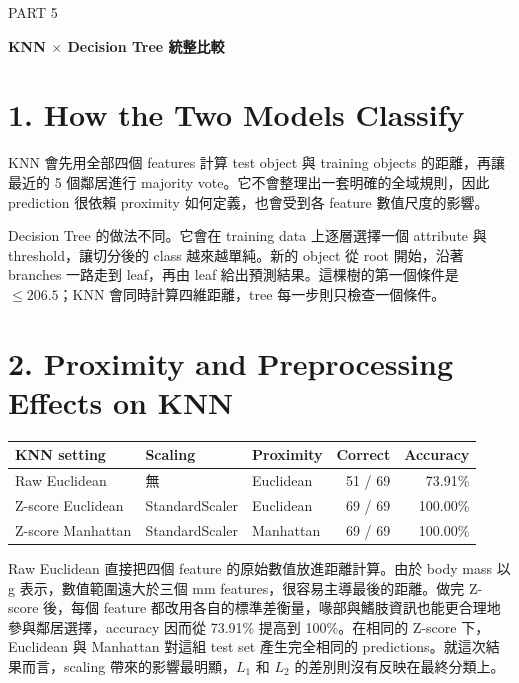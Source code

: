 \clearpage

\begin{center}
  {\color{accent}\large PART 5}\par
  \vspace{0.25em}
  {\Large\bfseries KNN $\times$ Decision Tree 統整比較}\par
\end{center}

\vspace{1.0em}

\section*{1. How the Two Models Classify}
\sectionrule

KNN 會先用全部四個 features 計算 test object 與 training objects 的距離，再讓最近的 5 個鄰居進行 majority vote。它不會整理出一套明確的全域規則，因此 prediction 很依賴 proximity 如何定義，也會受到各 feature 數值尺度的影響。

Decision Tree 的做法不同。它會在 training data 上逐層選擇一個 attribute 與 threshold，讓切分後的 class 越來越單純。新的 object 從 root 開始，沿著 branches 一路走到 leaf，再由 leaf 給出預測結果。這棵樹的第一個條件是 $\leq206.5$；KNN 會同時計算四維距離，tree 每一步則只檢查一個條件。

\section*{2. Proximity and Preprocessing Effects on KNN}
\sectionrule

\begin{table}[H]
\centering
\small
\begin{tabularx}{\linewidth}{L{3.8cm}L{2.6cm}Yrr}
\toprule
\textbf{KNN setting} & \textbf{Scaling} & \textbf{Proximity} & \textbf{Correct} & \textbf{Accuracy} \\
\midrule
Raw Euclidean & 無 & Euclidean & 51 / 69 & 73.91\% \\
Z-score Euclidean & StandardScaler & Euclidean & 69 / 69 & 100.00\% \\
Z-score Manhattan & StandardScaler & Manhattan & 69 / 69 & 100.00\% \\
\bottomrule
\end{tabularx}
\end{table}

Raw Euclidean 直接把四個 feature 的原始數值放進距離計算。由於 body mass 以 g 表示，數值範圍遠大於三個 mm features，很容易主導最後的距離。做完 Z-score 後，每個 feature 都改用各自的標準差衡量，喙部與鰭肢資訊也能更合理地參與鄰居選擇，accuracy 因而從 73.91\% 提高到 100\%。在相同的 Z-score 下，Euclidean 與 Manhattan 對這組 test set 產生完全相同的 predictions。就這次結果而言，scaling 帶來的影響最明顯，$L_1$ 和 $L_2$ 的差別則沒有反映在最終分類上。

